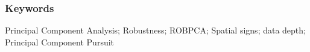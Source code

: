\documentclass[12pt]{article}
\begin{document}
\subsubsection*{Keywords}
Principal Component Analysis; Robustness; ROBPCA; Spatial signs; data depth; Principal Component Pursuit

\clearpage

\renewcommand{\baselinestretch}{1.5}
\normalsize

\clearpage

%










\end{document}
